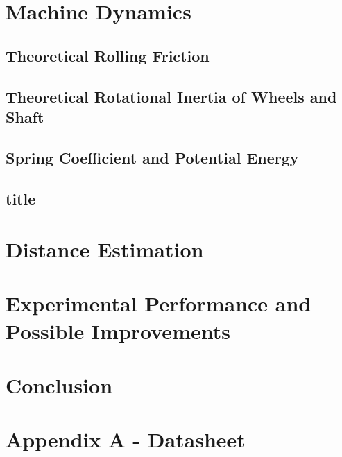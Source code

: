 \documentclass[a4paper]{article}
\begin{document}
\clearpage

\section{Machine Dynamics}
\subsection{Theoretical Rolling Friction}

\subsection{Theoretical Rotational Inertia of Wheels and Shaft}

\subsection{Spring Coefficient and Potential Energy}

\subsection{title}

\section{Distance Estimation}

\section{Experimental Performance and Possible Improvements}

\section{Conclusion}




\newpage

\section{Appendix A - Datasheet}
\end{document}
